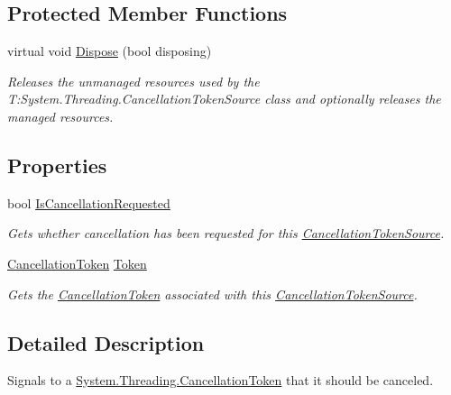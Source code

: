 \subsection*{Protected Member Functions}
\begin{DoxyCompactItemize}
\item 
virtual void \hyperlink{class_system_1_1_threading_1_1_cancellation_token_source_ae8d56cb1caec3466f3702c9fa155598a}{Dispose} (bool disposing)
\begin{DoxyCompactList}\small\item\em Releases the unmanaged resources used by the T\+:\+System.\+Threading.\+Cancellation\+Token\+Source class and optionally releases the managed resources. \end{DoxyCompactList}\end{DoxyCompactItemize}
\subsection*{Properties}
\begin{DoxyCompactItemize}
\item 
bool \hyperlink{class_system_1_1_threading_1_1_cancellation_token_source_adf148e540b8428fb73479f45bd90ebfc}{Is\+Cancellation\+Requested}
\begin{DoxyCompactList}\small\item\em Gets whether cancellation has been requested for this \hyperlink{}{Cancellation\+Token\+Source}. \end{DoxyCompactList}\item 
\hyperlink{struct_system_1_1_threading_1_1_cancellation_token}{Cancellation\+Token} \hyperlink{class_system_1_1_threading_1_1_cancellation_token_source_a2ab44a79f438139faf4f7dcce1b3e5b2}{Token}
\begin{DoxyCompactList}\small\item\em Gets the \hyperlink{struct_system_1_1_threading_1_1_cancellation_token}{Cancellation\+Token} associated with this \hyperlink{class_system_1_1_threading_1_1_cancellation_token_source}{Cancellation\+Token\+Source}. \end{DoxyCompactList}\end{DoxyCompactItemize}


\subsection{Detailed Description}
Signals to a \hyperlink{struct_system_1_1_threading_1_1_cancellation_token}{System.\+Threading.\+Cancellation\+Token} that it should be canceled. 

